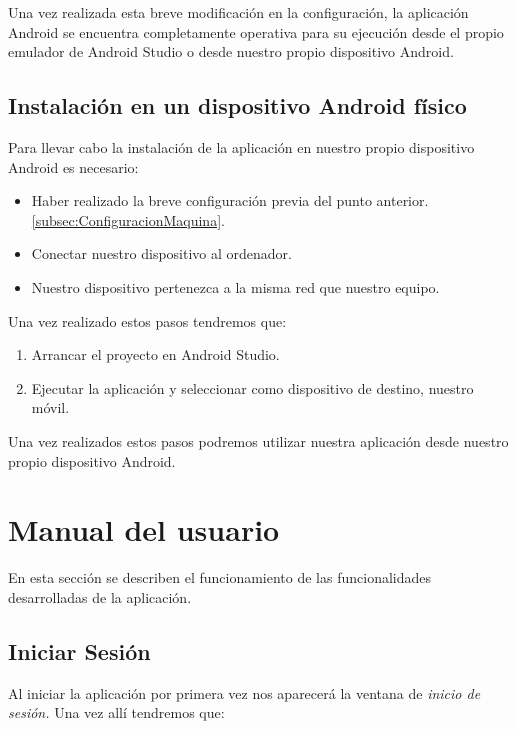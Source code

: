Una vez realizada esta breve modificación en la configuración, la aplicación Android se encuentra completamente operativa para su ejecución desde el propio emulador de Android Studio o desde nuestro propio dispositivo Android.

\subsection{Instalación en un dispositivo Android físico}

Para llevar cabo la instalación de la aplicación en nuestro propio dispositivo Android es necesario:

\begin{itemize}
	\item Haber realizado la breve configuración previa del punto anterior. \ref{subsec:ConfiguracionMaquina}.
	
	\item Conectar nuestro dispositivo al ordenador.
	
	\item Nuestro dispositivo pertenezca a la misma red que nuestro equipo.
\end{itemize}

Una vez realizado estos pasos tendremos que:

\begin{enumerate}
	\item Arrancar el proyecto en Android Studio.
	\item Ejecutar la aplicación y seleccionar como dispositivo de destino, nuestro móvil.
\end{enumerate}

Una vez realizados estos pasos podremos utilizar nuestra aplicación desde nuestro propio dispositivo Android.

\section{Manual del usuario}

En esta sección se describen el funcionamiento de las funcionalidades desarrolladas de la aplicación.

\subsection{Iniciar Sesión}

Al iniciar la aplicación por primera vez nos aparecerá la ventana de \emph{inicio de sesión.} Una vez allí tendremos que:

